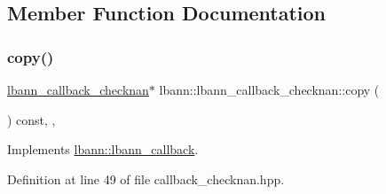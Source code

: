 \subsection{Member Function Documentation}
\mbox{\label{classlbann_1_1lbann__callback__checknan_ad7156df3cd81c493584ebd4a0c9d96b4}} 
\subsubsection{\texorpdfstring{copy()}{copy()}}
{\footnotesize\ttfamily \hyperlink{classlbann_1_1lbann__callback__checknan}{lbann\+\_\+callback\+\_\+checknan}$\ast$ lbann\+::lbann\+\_\+callback\+\_\+checknan\+::copy (\begin{DoxyParamCaption}{ }\end{DoxyParamCaption}) const\hspace{0.3cm}{\ttfamily [inline]}, {\ttfamily [override]}, {\ttfamily [virtual]}}



Implements \hyperlink{classlbann_1_1lbann__callback_a9f545d1269a8c7af335625d049691f26}{lbann\+::lbann\+\_\+callback}.



Definition at line 49 of file callback\+\_\+checknan.\+hpp.


